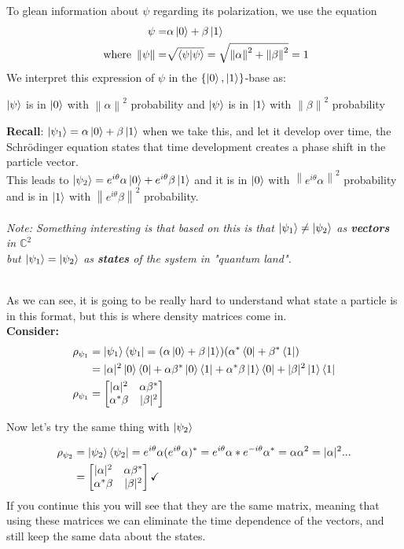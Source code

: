 \documentclass[12pt]{article}
\theoremstyle{plain}
\theoremstyle{nonumberplain}
\theoremstyle{plain}
\theoremstyle{nonumberplain}
\newcommand\1{{\bf 1}}
\newcommand{\bmat}[1]{\begin{bmatrix*} #1 \end{bmatrix*}} %
\newcommand{\C}{\mathbb{C}} %
\newcommand{\<}{\left\langle}
\renewcommand{\>}{\right\rangle}
\newcommand{\norm}[1]{\left\lVert#1\right\rVert} %
\begin{document}
To glean information about $\psi$ regarding its polarization, we use the equation
\begin{align*}
\psi = &\alpha\ket{0} + \beta\ket{1}\\
\text{ where } \norm{\psi} = &\sqrt{\braket{\psi|\psi}} = \sqrt{\norm{\alpha}^2+\norm{\beta}^2} = 1
\end{align*}
We interpret this expression of $\psi$ in the $\{\ket{0}, \ket{1}\}$-base as: 
\begin{center}
$\ket{\psi}$ is in $\ket{0}$ with $\norm{\alpha}^2$ probability    and     $\ket{\psi}$ is in $\ket{1}$ with $\norm{\beta}^2$ probability 
\end{center}
\textbf{Recall}: $\ket{\psi_1} = \alpha\ket{0} + \beta\ket{1}$ when we take this, and let it develop over time, the Schrödinger equation states that time development creates a phase shift in the particle vector.\\
This leads to $\ket{\psi_2} = e^{i\theta}\alpha\ket{0} + e^{i\theta}\beta\ket{1}$ and it is in $\ket{0}$ with $\norm{e^{i\theta}\alpha}^2$ probability and is in $\ket{1}$ with $\norm{e^{i\theta}\beta}^2$ probability.\\
\\
\textit{Note: Something interesting is that based on this is that $\ket{\psi_1} \neq \ket{\psi_2}$ as \textbf{vectors} in $\C^2$\\
but $\ket{\psi_1} = \ket{\psi_2}$ as \textbf{states} of the system in "quantum land".}\\
\\

\pagebreak

As we can see, it is going to be really hard to understand what state a particle is in this format, but this is where density matrices come in.\\
\textbf{Consider:}
\begin{align*}
\rho_{\psi_1} &= \ket{\psi_1}\bra{\psi_1} = (\alpha\ket{0} + \beta\ket{1})(\alpha^*\bra{0} + \beta^*\bra{1})\\
&= |\alpha|^2\ket{0}\bra{0} + \alpha\beta^*\ket{0}\bra{1} + \alpha^*\beta\ket{1}\bra{0} + |\beta|^2\ket{1}\bra{1}\\
\rho_{\psi_1} &= \bmat{|\alpha|^2 &\alpha\beta^*\\ \alpha^*\beta &|\beta|^2} 
\end{align*}
\begin{center}
Now let's try the same thing with $\ket{\psi_2}$
\end{center}
\begin{align*}
\rho_{\psi_2} &= \ket{\psi_2}\bra{\psi_2} = e^{i\theta}\alpha(e^{i\theta}\alpha)^* = e^{i\theta}\alpha * e^{-i\theta}\alpha^* = \alpha\alpha^2 = |\alpha|^2...\\
&= \bmat{|\alpha|^2 &\alpha\beta^*\\ \alpha^*\beta &|\beta|^2}  \checkmark
\end{align*}
If you continue this you will see that they are the same matrix, meaning that using these matrices we can eliminate the time dependence of the vectors, and still keep the same data about the states.
\end{document}

